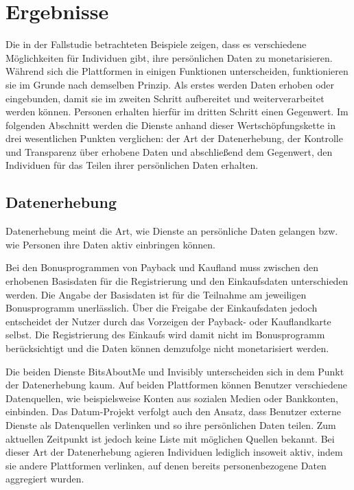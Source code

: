 \section{Ergebnisse}
Die in der Fallstudie betrachteten Beispiele zeigen, dass es verschiedene Möglichkeiten für Individuen gibt, ihre persönlichen Daten zu monetarisieren. Während sich die Plattformen in einigen Funktionen unterscheiden, funktionieren sie im Grunde nach demselben Prinzip. Als erstes werden Daten erhoben oder eingebunden, damit sie im zweiten Schritt aufbereitet und weiterverarbeitet werden können. Personen erhalten hierfür im dritten Schritt einen Gegenwert. Im folgenden Abschnitt werden die Dienste anhand dieser Wertschöpfungskette in drei wesentlichen Punkten verglichen: der Art der Datenerhebung, der Kontrolle und Transparenz über erhobene Daten und abschließend dem Gegenwert, den Individuen für das Teilen ihrer persönlichen Daten erhalten.

\subsection{Datenerhebung}
Datenerhebung meint die Art, wie Dienste an persönliche Daten gelangen bzw. wie Personen ihre Daten aktiv einbringen können. \newline

\noindent Bei den Bonusprogrammen von Payback und Kaufland muss zwischen den erhobenen Basisdaten für die Registrierung und den Einkaufsdaten unterschieden werden. Die Angabe der Basisdaten ist für die Teilnahme am jeweiligen Bonusprogramm unerlässlich. Über die Freigabe der Einkaufsdaten jedoch entscheidet der Nutzer durch das Vorzeigen der Payback- oder Kauflandkarte selbst. Die Registrierung des Einkaufs wird damit nicht im Bonusprogramm berücksichtigt und die Daten können demzufolge nicht monetarisiert werden. \newline

\noindent Die beiden Dienste BitsAboutMe und Invisibly unterscheiden sich in dem Punkt der Datenerhebung kaum. Auf beiden Plattformen können Benutzer verschiedene Datenquellen, wie beispielsweise Konten aus sozialen Medien oder Bankkonten, einbinden. Das Datum-Projekt verfolgt auch den Ansatz, dass Benutzer externe Dienste als Datenquellen verlinken und so ihre persönlichen Daten teilen. Zum aktuellen Zeitpunkt ist jedoch keine Liste mit möglichen Quellen bekannt. Bei dieser Art der Datenerhebung agieren Individuen lediglich insoweit aktiv, indem sie andere Plattformen verlinken, auf denen bereits personenbezogene Daten aggregiert wurden. \newline

